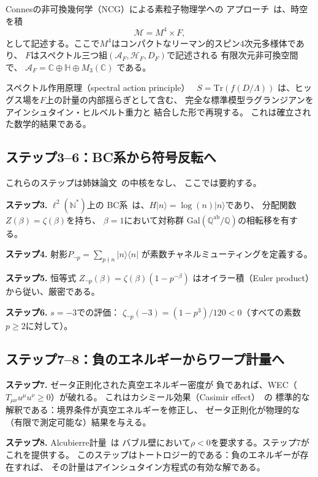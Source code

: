 \documentclass[11pt,a4paper]{article}
\newcommand{\Tr}{\mathrm{Tr}}
\newcommand{\Gal}{\mathrm{Gal}}
\begin{document}
Connesの非可換幾何学（NCG）による素粒子物理学への
アプローチ~\cite{Connes1996,CCM2007}は、時空を積
\begin{equation}
  \mathcal{M} = M^4 \times F,
\end{equation}
として記述する。ここで$M^4$はコンパクトなリーマン的スピン4次元多様体であり、
$F$はスペクトル三つ組$(\mathcal{A}_F, \mathcal{H}_F, D_F)$で記述される
有限次元非可換空間で、
$\mathcal{A}_F = \mathbb{C} \oplus \mathbb{H} \oplus M_3(\mathbb{C})$
である。

スペクトル作用原理（spectral action principle）~\cite{CCM2007}
$S = \Tr(f(D/\Lambda))$
は、ヒッグス場を$F$上の計量の内部揺らぎとして含む、
完全な標準模型ラグランジアンをアインシュタイン・ヒルベルト重力と
結合した形で再現する。
これは確立された数学的結果である。

\subsection{ステップ3--6：BC系から符号反転へ}

これらのステップは姉妹論文~\cite{paper_A}の中核をなし、
ここでは要約する。

\textbf{ステップ3.} $\ell^2(\mathbb{N}^*)$上の
BC系~\cite{BostConnes1995}は、$H|n\rangle = \log(n)|n\rangle$であり、
分配関数$Z(\beta) = \zeta(\beta)$を持ち、
$\beta = 1$において対称群
$\Gal(\mathbb{Q}^{\mathrm{ab}}/\mathbb{Q})$の相転移を有する。

\textbf{ステップ4.} 射影$P_{\neg p} = \sum_{p \nmid n} |n\rangle\langle n|$
が素数チャネルミューティングを定義する。

\textbf{ステップ5.} 恒等式
$Z_{\neg p}(\beta) = \zeta(\beta)(1-p^{-\beta})$
はオイラー積（Euler product）から従い、厳密である。

\textbf{ステップ6.} $s = -3$での評価：
$\zeta_{\neg p}(-3) = (1-p^3)/120 < 0$（すべての素数$p \geq 2$に対して）。

\subsection{ステップ7--8：負のエネルギーからワープ計量へ}

\textbf{ステップ7.} ゼータ正則化された真空エネルギー密度が
負であれば、WEC（$T_{\mu\nu} u^\mu u^\nu \geq 0$）が破れる。
これはカシミール効果（Casimir effect）~\cite{Casimir1948,Bordag2009}の
標準的な解釈である：境界条件が真空エネルギーを修正し、
ゼータ正則化が物理的な（有限で測定可能な）結果を与える。

\textbf{ステップ8.} Alcubierre計量~\cite{Alcubierre1994}は
バブル壁において$\rho < 0$を要求する。ステップ7がこれを提供する。
このステップはトートロジー的である：負のエネルギーが存在すれば、
その計量はアインシュタイン方程式の有効な解である。
\end{document}
